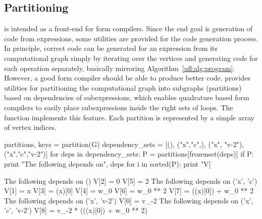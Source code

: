 \subsection{Partitioning}

\ufl{} is intended as a front-end for form compilers.  Since the end
goal is generation of code from expressions, some utilities are
provided for the code generation process. In principle, correct code
can be generated for an expression from its computational graph simply
by iterating over the vertices and generating code for each operation
separately, basically mirroring Algorithm~\ref{ufl:alg:program}.
However, a good form compiler should be able to produce better code.
\ufl{} provides utilities for partitioning the computational graph
into subgraphs (partitions) based on dependencies of subexpressions,
which enables quadrature based form compilers to easily place
subexpressions inside the right sets of loops.  The function
 implements this feature.  Each partition is
represented by a simple array of vertex indices.



\begin{python}
partitions, keys = partition(G)
dependency_sets = [(), ("x","c",), ("x", "v-2"), ("x","c","v-2")]
for deps in dependency_sets:
    P = partitions[frozenset(deps)]
    if P:
        print "The following depends on", deps
        for i in sorted(P):
            print "V[%
\end{python}

\begin{code}
The following depends on ()
V[2] = 0
V[5] = 2
The following depends on ('x', 'c')
V[1] = x
V[3] = (x)[0]
V[4] = w_0
V[6] = w_0 ** 2
V[7] = ((x)[0]) + w_0 ** 2
The following depends on ('x', 'v-2')
V[0] = v_{-2}
The following depends on ('x', 'c', 'v-2')
V[8] = v_{-2} * (((x)[0]) + w_0 ** 2)
\end{code}

